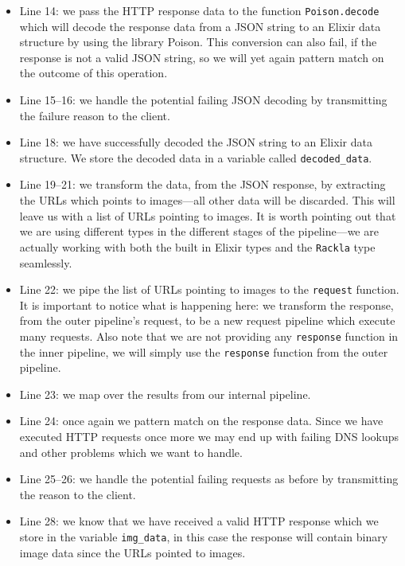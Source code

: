 \documentclass{cslthse-msc}
\begin{document}
\begin{itemize}
\item Line 14: we pass the HTTP response data to the function \lstinline{Poison.decode} which will decode the response data from a JSON string to an Elixir data structure by using the library Poison\cite{poison}. This conversion can also fail, if the response is not a valid JSON string, so we will yet again pattern match on the outcome of this operation.

\item Line 15--16: we handle the potential failing JSON decoding by transmitting the failure reason to the client.

\item Line 18: we have successfully decoded the JSON string to an Elixir data structure. We store the decoded data in a variable called \lstinline{decoded_data}.

\item Line 19--21: we transform the data, from the JSON response, by extracting the URLs which points to images---all other data will be discarded. This will leave us with a list of URLs pointing to images. It is worth pointing out that we are using different types in the different stages of the pipeline---we are actually working with both the built in Elixir types and the \lstinline{Rackla} type seamlessly.

\item Line 22: we pipe the list of URLs pointing to images to the \lstinline{request} function. It is important to notice what is happening here: we transform the response, from the outer pipeline's request, to be a new request pipeline which execute many requests. Also note that we are not providing any \lstinline{response} function in the inner pipeline, we will simply use the \lstinline{response} function from the outer pipeline.

\item Line 23: we map over the results from our internal pipeline.

\item Line 24: once again we pattern match on the response data. Since we have executed HTTP requests once more we may end up with failing DNS lookups and other problems which we want to handle.

\item Line 25--26: we handle the potential failing requests as before by transmitting the reason to the client.

\item Line 28: we know that we have received a valid HTTP response which we store in the variable \lstinline{img_data}, in this case the response will contain binary image data since the URLs pointed to images.


\end{itemize}
\end{document}
